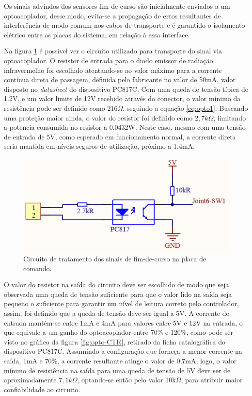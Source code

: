 Os sinais advindos dos sensores fim-de-curso são inicialmente enviados
a um optoacoplador, desse modo, evita-se a propagação de erros resultantes 
de interferência de modo comum nos cabos de transporte e é garantido 
o isolamento elétrico entre as placas do sistema, em relação à essa 
interface.

Na figura \ref{fig:MainPCB-Optoacopladores} é possível ver o circuito
utilizado para transporte do sinal via optoacoplador. O resistor de entrada 
para o diodo emissor de radiação infravermelho foi escolhido atentando-se 
ao valor máximo para a corrente contínua direta de passagem, definida
pelo fabricante no valor de 50mA, valor disposto no \textit{datasheet} do dispositivo PC817C. 
Com uma queda de tensão típica de 1.2V,
e um valor limite de 12V recebido através do conector, o valor mínimo
da resistência pode ser definido como $216\Omega$, seguindo a equação \ref{eq:opto1}.
Buscando uma proteção maior ainda, o valor do resistor foi definido como $2,7k\Omega$, 
limitando a potencia consumida no resistor a 0.0432W.
Neste caso, mesmo com uma tensão de entrada de 5V, como esperado em funcionamento
normal, a corrente direta seria mantida em níveis seguros de utilização,
próximo a 1.4mA.

\begin{figure}[h]
    \caption{Circuito de tratamento dos sinais de fim-de-curso na placa de comando.}    
    \begin{centering}

        \includegraphics[width=0.65\columnwidth]{images/pcbs/MainPCB-Opto.png}
    
    \par\end{centering}

    \label{fig:MainPCB-Optoacopladores}
\end{figure}

O valor do resistor na saída do circuito deve ser 
escolhido de modo que seja observada uma queda de tensão suficiente 
para que o valor lido na saída seja pequeno o suficiente para garantir
um nível de leitura correto pelo controlador, assim, foi definido que a 
queda de tensão deve ser igual a 5V. A corrente de entrada mantém-se 
entre 1mA e 4mA para valores entre 5V e 12V na entrada, o que equivale
a um ganho do optoacoplador entre 70\% e 120\%, como pode ser visto no 
gráfico da figura \ref{fig:opto-CTR}, retirado da ficha catalográfica do 
dispositivo PC817C. 
Assumindo a configuração que forneça a menor corrente na saída, 1mA e 70\%, a corrente resultante
atinge o valor de 0,7mA, logo, o valor mínimo de resistência na saída 
para uma queda de tensão de 5V deve ser de aproximadamente $7,1k\Omega$, optando-se então pelo valor 10k$\Omega$,
para atribuir maior confiabilidade ao circuito.

